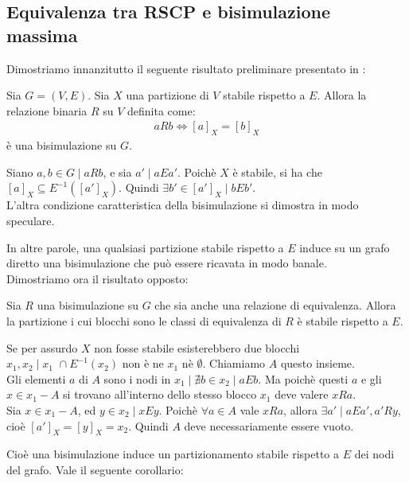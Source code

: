 \subsection{Equivalenza tra RSCP e bisimulazione massima}
Dimostriamo innanzitutto il seguente risultato preliminare presentato in \cite{gentilini}:
\begin{proposition}
    Sia $G = (V,E)$. Sia $X$ una partizione di $V$ stabile rispetto a $E$. Allora la relazione binaria $R$ su $V$ definita come:
    \begin{gather*}
        a R b \iff [a]_X = [b]_X
    \end{gather*}
    è una bisimulazione su $G$.
    \label{prop:part_induce_bisi}
\end{proposition}
\begin{proof2}
    Siano $a,b \in G \mid a R b$, e sia $a' \mid a E a'$. Poichè $X$ è stabile, si ha che $[a]_X \subseteq E^{-1}([a']_X)$. Quindi $\exists b' \in [a']_X \mid b E b'$.\\
    L'altra condizione caratteristica della bisimulazione si dimostra in modo speculare.
\end{proof2}
In altre parole, una qualsiasi partizione stabile rispetto a $E$ induce su un grafo diretto una bisimulazione che può essere ricavata in modo banale.\\
Dimostriamo ora il risultato opposto:
\begin{proposition}
    Sia $R$ una bisimulazione su $G$ che sia anche una relazione di equivalenza. Allora la partizione i cui blocchi sono le classi di equivalenza di $R$ è stabile rispetto a $E$.
    \label{prop:bisi_induce_part}
\end{proposition}
\begin{proof2}
    Se per assurdo $X$ non fosse stabile esisterebbero due blocchi $x_1, x_2 \mid x_1 \,\,\cap E^{-1}(x_2)$ non è ne $x_1$ nè $\emptyset$. Chiamiamo $A$ questo insieme.\\
    Gli elementi $a$ di $A$ sono i nodi in $x_1 \mid \nexists b \in x_2 \mid a E b$. Ma poichè questi $a$ e gli $x \in x_1 - A$ si trovano all'interno dello stesso blocco $x_1$ deve valere $x R a$.\\
    Sia $x \in x_1 - A$, ed $y \in x_2 \mid x E y$. Poichè $\forall a \in A$ vale $x R a$, allora $\exists a' \mid a E a', a' R y$, cioè $[a']_X = [y]_X = x_2$. Quindi $A$ deve necessariamente essere vuoto.
\end{proof2}
Cioè una bisimulazione induce un partizionamento stabile rispetto a $E$ dei nodi del grafo. Vale il seguente corollario:
